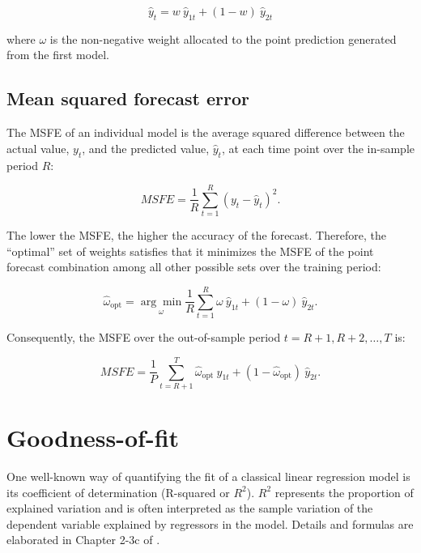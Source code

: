 \documentclass{monashthesis}
\begin{document}
\begin{equation}
\label{eqn:PC1}
\hat y_t = w \ \hat y_{1t} + (1-w) \ \hat y_{2t}
\end{equation}

where \(\omega\) is the non-negative weight allocated to the point prediction generated from the first model.

\hypertarget{mean-squared-forecast-error}{%
\subsection{Mean squared forecast error}\label{mean-squared-forecast-error}}

The MSFE of an individual model is the average squared difference between the actual value, \(y_t\), and the predicted value, \(\hat y_t\), at each time point over the in-sample period \(R\):

\begin{equation}
\label{eqn:MSFE1}
MSFE = \frac{1}{R} \sum^R_{t=1} (y_t - \hat y_t)^2.
\end{equation}

The lower the MSFE, the higher the accuracy of the forecast. Therefore, the ``optimal'' set of weights satisfies that it minimizes the MSFE of the point forecast combination among all other possible sets over the training period:

\begin{equation}
\label{eqn:MSFE2}
\hat{\omega}_{\text{opt}} = \underset{\omega}{\arg\min} \frac{1}{R} \sum^R_{t=1} \omega \ \hat y_{1t} + (1-\omega) \ \hat y_{2t}.
\end{equation}

Consequently, the MSFE over the out-of-sample period \(t = R+1, R+2, \dots, T\) is:

\begin{equation}
\label{eqn:MSFE3}
MSFE = \frac{1}{P} \sum^T_{t = R+1} \hat{\omega}_{\text{opt}} \ \hat y_{1t} + (1-\hat{\omega}_{\text{opt}}) \ \hat y_{2t}.
\end{equation}

\hypertarget{goodness-of-fit}{%
\section{Goodness-of-fit}\label{goodness-of-fit}}

One well-known way of quantifying the fit of a classical linear regression model is its coefficient of determination (R-squared or \(R^2\)). \(R^2\) represents the proportion of explained variation and is often interpreted as the sample variation of the dependent variable explained by regressors in the model. Details and formulas are elaborated in Chapter 2-3c of \textcite{W15}.
\end{document}
